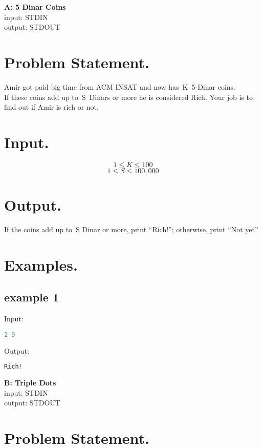 \documentclass[10pt]{article}
\begin{document}
\begin{center}
    \Huge { \textbf{A: 5 Dinar Coins}} \\ 
    \normalsize  { input:  STDIN}\\
    \normalsize{    output: STDOUT}
\end{center}
\section{Problem Statement.}
Amir got paid big time from ACM INSAT and now has K 5-Dinar coins.\\
If these coins add up to S Dinars or more he is considered Rich. Your job is to find out if Amir is rich or not.
\paragraph{}
\section{Input.}
$$ 1\le K \le 100 $$
$$ 1\le S \le 100,000 $$
\section{Output.}

If the coins add up to S Dinar or more, print “Rich!”; otherwise, print “Not yet”

\section{Examples.}
\subsection{example 1}
Input:
\begin{lstlisting}[language=Python]
2 9
\end{lstlisting}
Output:
\begin{lstlisting}[language=Python]
Rich!
\end{lstlisting}
\newpage
\begin{center}
    \Huge { \textbf{B: Triple Dots}}\\
    \normalsize  { input:  STDIN}\\
    \normalsize{    output: STDOUT}

\end{center}

\section{Problem Statement.}
\end{document}
